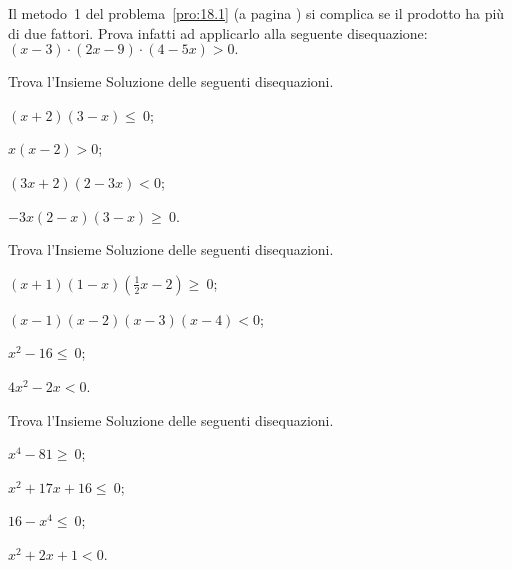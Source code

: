 \begin{esercizio}
 \label{ese:18.46}
 Il metodo~1 del problema~\ref{pro:18.1} (a pagina \pageref{pro:18.1}) si complica se il prodotto ha
più di due fattori. Prova infatti ad applicarlo alla seguente
disequazione:
$(x-3)\cdot (2x-9)\cdot (4-5x)>0.$
\end{esercizio}

\begin{esercizio}[\Ast]
 \label{ese:18.47}
Trova l'Insieme Soluzione delle seguenti disequazioni.
\begin{multicols}{2}
 \begin{enumeratea}
 \item $(x+2)(3-x)\le~0$;
\item $x(x-2)>0$;
\item $(3x+2)(2-3x)<0$;
\item $-3x(2-x)(3-x)\ge~0$.
\end{enumeratea}
\end{multicols}
\end{esercizio}

\begin{esercizio}[\Ast]
 \label{ese:18.48}
Trova l'Insieme Soluzione delle seguenti disequazioni.
\begin{multicols}{2}
 \begin{enumeratea}
 \item $(x+1)(1-x)\left(\frac{1}{2}x-2\right)\ge~0$;
\item $(x-1)(x-2)(x-3)(x-4)<0$;
\item $x^{2}-16\le~0$;
\item $4x^{2}-2x<0$.
\end{enumeratea}
\end{multicols}
\end{esercizio}

\begin{esercizio}[\Ast]
 \label{ese:18.49}
Trova l'Insieme Soluzione delle seguenti disequazioni.
\begin{multicols}{2}
 \begin{enumeratea}
 \item $x^{4}-81\ge~0$;
\item $x^{2}+17x+16\le~0$;
\item $16-x^{4}\le~0$;
\item $x^{2}+2x+1<0$.
\end{enumeratea}
\end{multicols}
\end{esercizio}

\pagebreak

